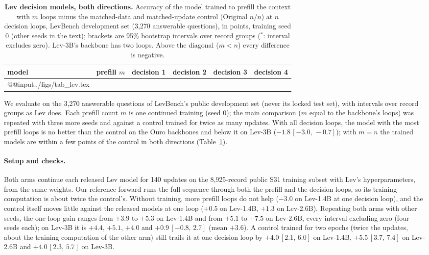 \documentclass[11pt]{article}
\newcommand{\ci}[2]{\,{\scriptsize\ensuremath{[#1,\,#2]}}}
\begin{document}
\begin{table}[t]
\centering\small
\setlength\tabcolsep{3pt}
\begin{tabular}{@{}lccccc@{}}
\toprule
model & prefill $m$ & decision 1 & decision 2 & decision 3 & decision 4 \\
\midrule
\csname @@input\endcsname ../figs/tab_lev.tex
\bottomrule
\end{tabular}
\caption{\textbf{Lev decision models, both directions.} Accuracy of the model trained to prefill the context with $m$
loops minus the matched-data and matched-update control (Original $n/n$) at $n$ decision loops, LevBench development set (3,270 answerable
questions), in points, training seed 0 (other seeds in the text); brackets are 95\% bootstrap intervals over record groups ($^*$: interval excludes zero). Lev-3B's
backbone has two loops. Above the diagonal ($m<n$) every difference is negative.}
\label{tab:lev}
\end{table}

We evaluate on the 3,270 answerable questions of LevBench's public development set (never its locked test set), with
intervals over record groups as Lev does. Each prefill count $m$ is one continued training (seed 0); the main comparison
($m$ equal to the backbone's loops) was repeated with three more seeds and against a control trained for twice as many
updates. With all decision loops, the model with the most prefill loops is no better than the control on the Ouro backbones
and below it on Lev-3B ($-1.8$\ci{-3.0}{-0.7}); with $m=n$ the trained models are within a few points of the control in
both directions (Table~\ref{tab:lev}).

\paragraph{Setup and checks.}
Both arms continue each released Lev model for 140 updates on the 8,925-record public S31 training subset with Lev's
hyperparameters, from the same weights. Our reference forward runs the full sequence through both the prefill and the
decision loops, so its training computation is about twice the control's. Without training, more prefill loops do not help
($-3.0$ on Lev-1.4B at one decision loop), and the control itself moves little against the released models at one loop
($+0.5$ on Lev-1.4B, $+1.3$ on Lev-2.6B). Repeating both arms with other seeds, the one-loop gain ranges from $+3.9$ to
$+5.3$ on Lev-1.4B and from $+5.1$ to $+7.5$ on Lev-2.6B, every interval excluding zero (four seeds each); on Lev-3B it is
$+4.4$, $+5.1$, $+4.0$ and $+0.9$\ci{-0.8}{2.7} (mean $+3.6$). A control trained for two epochs (twice the updates, about
the training computation of the other arm) still trails it at one decision loop by $+4.0$\ci{2.1}{6.0} on Lev-1.4B,
$+5.5$\ci{3.7}{7.4} on Lev-2.6B and $+4.0$\ci{2.3}{5.7} on Lev-3B.
\end{document}
